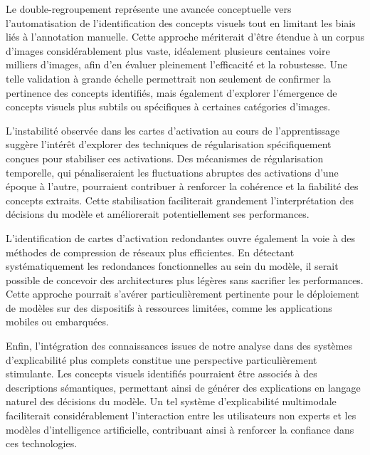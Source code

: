 \documentclass[runningheads]{llncs}
\begin{document}
Le double-regroupement représente une avancée conceptuelle vers l'automatisation de l'identification des concepts visuels tout en limitant les biais liés à l'annotation manuelle. Cette approche mériterait d'être étendue à un corpus d'images considérablement plus vaste, idéalement plusieurs centaines voire milliers d'images, afin d'en évaluer pleinement l'efficacité et la robustesse. Une telle validation à grande échelle permettrait non seulement de confirmer la pertinence des concepts identifiés, mais également d'explorer l'émergence de concepts visuels plus subtils ou spécifiques à certaines catégories d'images.

L'instabilité observée dans les cartes d'activation au cours de l'apprentissage suggère l'intérêt d'explorer des techniques de régularisation spécifiquement conçues pour stabiliser ces activations. Des mécanismes de régularisation temporelle, qui pénaliseraient les fluctuations abruptes des activations d'une époque à l'autre, pourraient contribuer à renforcer la cohérence et la fiabilité des concepts extraits. Cette stabilisation faciliterait grandement l'interprétation des décisions du modèle et améliorerait potentiellement ses performances.

L'identification de cartes d'activation redondantes ouvre également la voie à des méthodes de compression de réseaux plus efficientes. En détectant systématiquement les redondances fonctionnelles au sein du modèle, il serait possible de concevoir des architectures plus légères sans sacrifier les performances. Cette approche pourrait s'avérer particulièrement pertinente pour le déploiement de modèles sur des dispositifs à ressources limitées, comme les applications mobiles ou embarquées.

Enfin, l'intégration des connaissances issues de notre analyse dans des systèmes d'explicabilité plus complets constitue une perspective particulièrement stimulante. Les concepts visuels identifiés pourraient être associés à des descriptions sémantiques, permettant ainsi de générer des explications en langage naturel des décisions du modèle. Un tel système d'explicabilité multimodale faciliterait considérablement l'interaction entre les utilisateurs non experts et les modèles d'intelligence artificielle, contribuant ainsi à renforcer la confiance dans ces technologies. 

\printbibliography
\end{document}
